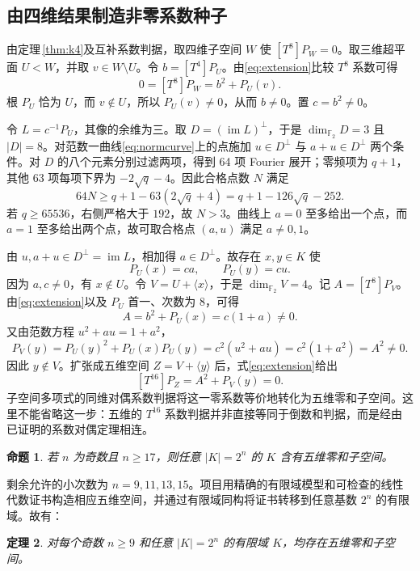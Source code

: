 \documentclass[UTF8,a4paper,11pt]{ctexart}
\numberwithin{equation}{section}
\newtheorem{theorem}{定理}[section]
\newtheorem{proposition}[theorem]{命题}
\theoremstyle{definition}
\theoremstyle{remark}
\newcommand{\Ftwo}{\mathbb F_2}
\newcommand{\dimf}{\dim_{\Ftwo}}
\begin{document}
\subsection{由四维结果制造非零系数种子}

由定理\,\ref{thm:k4}及互补系数判据，取四维子空间 $W$ 使 $[T^8]P_W=0$。取三维超平面 $U<W$，并取 $v\in W\setminus U$。令 $b=[T^4]P_U$。由\eqref{eq:extension}比较 $T^8$ 系数可得
\[
 0=[T^8]P_W=b^2+P_U(v).
\]
根 $P_U$ 恰为 $U$，而 $v\notin U$，所以 $P_U(v)\ne0$，从而 $b\ne0$。置 $c=b^2\ne0$。

令 $L=c^{-1}P_U$，其像的余维为三。取 $D=(\operatorname{im}L)^\perp$，于是 $\dimf D=3$ 且 $|D|=8$。对范数一曲线\eqref{eq:normcurve}上的点施加 $u\in D^\perp$ 与 $a+u\in D^\perp$ 两个条件。对 $D$ 的八个元素分别过滤两项，得到 64 项 Fourier 展开；零频项为 $q+1$，其他 63 项每项下界为 $-2\sqrt q-4$。因此合格点数 $N$ 满足
\begin{equation}\label{eq:k5count}
 64N\ge q+1-63(2\sqrt q+4)=q+1-126\sqrt q-252.
\end{equation}
若 $q\ge65536$，右侧严格大于 $192$，故 $N>3$。曲线上 $a=0$ 至多给出一个点，而 $a=1$ 至多给出两个点，故可取合格点 $(a,u)$ 满足 $a\ne0,1$。

由 $u,a+u\in D^\perp=\operatorname{im}L$，相加得 $a\in D^\perp$。故存在 $x,y\in K$ 使
\[
 P_U(x)=ca,\qquad P_U(y)=cu.
\]
因为 $a,c\ne0$，有 $x\notin U$。令 $V=U+\langle x\rangle$，于是 $\dimf V=4$。记 $A=[T^8]P_V$。由\eqref{eq:extension}以及 $P_U$ 首一、次数为 $8$，可得
\[
 A=b^2+P_U(x)=c(1+a)\ne0.
\]
又由范数方程 $u^2+au=1+a^2$，
\[
 P_V(y)=P_U(y)^2+P_U(x)P_U(y)
       =c^2(u^2+au)=c^2(1+a^2)=A^2\ne0.
\]
因此 $y\notin V$。扩张成五维空间 $Z=V+\langle y\rangle$ 后，式\eqref{eq:extension}给出
\[
 [T^{16}]P_Z=A^2+P_V(y)=0.
\]
子空间多项式的同维对偶系数判据将这一零系数等价地转化为五维零和子空间。这里不能省略这一步：五维的 $T^{16}$ 系数判据并非直接等同于倒数和判据，而是经由已证明的系数对偶定理相连。

\begin{proposition}\label{prop:k5large}
若 $n$ 为奇数且 $n\ge17$，则任意 $|K|=2^n$ 的 $K$ 含有五维零和子空间。
\end{proposition}

剩余允许的小次数为 $n=9,11,13,15$。项目用精确的有限域模型和可检查的线性代数证书构造相应五维空间，并通过有限域同构将证书转移到任意基数 $2^n$ 的有限域。故有：
\begin{theorem}\label{thm:k5}
对每个奇数 $n\ge9$ 和任意 $|K|=2^n$ 的有限域 $K$，均存在五维零和子空间。
\end{theorem}
\end{document}
